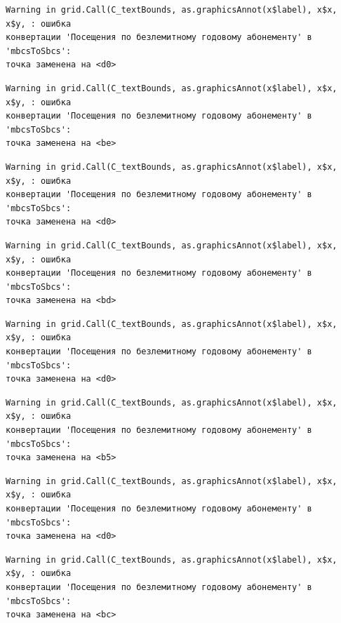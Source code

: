\documentclass[
  letterpaper,
  DIV=11,
  numbers=noendperiod]{scrreprt}
\begin{document}
\begin{verbatim}
Warning in grid.Call(C_textBounds, as.graphicsAnnot(x$label), x$x, x$y, : ошибка
конвертации 'Посещения по безлемитному годовому абонементу' в 'mbcsToSbcs':
точка заменена на <d0>
\end{verbatim}

\begin{verbatim}
Warning in grid.Call(C_textBounds, as.graphicsAnnot(x$label), x$x, x$y, : ошибка
конвертации 'Посещения по безлемитному годовому абонементу' в 'mbcsToSbcs':
точка заменена на <be>
\end{verbatim}

\begin{verbatim}
Warning in grid.Call(C_textBounds, as.graphicsAnnot(x$label), x$x, x$y, : ошибка
конвертации 'Посещения по безлемитному годовому абонементу' в 'mbcsToSbcs':
точка заменена на <d0>
\end{verbatim}

\begin{verbatim}
Warning in grid.Call(C_textBounds, as.graphicsAnnot(x$label), x$x, x$y, : ошибка
конвертации 'Посещения по безлемитному годовому абонементу' в 'mbcsToSbcs':
точка заменена на <bd>
\end{verbatim}

\begin{verbatim}
Warning in grid.Call(C_textBounds, as.graphicsAnnot(x$label), x$x, x$y, : ошибка
конвертации 'Посещения по безлемитному годовому абонементу' в 'mbcsToSbcs':
точка заменена на <d0>
\end{verbatim}

\begin{verbatim}
Warning in grid.Call(C_textBounds, as.graphicsAnnot(x$label), x$x, x$y, : ошибка
конвертации 'Посещения по безлемитному годовому абонементу' в 'mbcsToSbcs':
точка заменена на <b5>
\end{verbatim}

\begin{verbatim}
Warning in grid.Call(C_textBounds, as.graphicsAnnot(x$label), x$x, x$y, : ошибка
конвертации 'Посещения по безлемитному годовому абонементу' в 'mbcsToSbcs':
точка заменена на <d0>
\end{verbatim}

\begin{verbatim}
Warning in grid.Call(C_textBounds, as.graphicsAnnot(x$label), x$x, x$y, : ошибка
конвертации 'Посещения по безлемитному годовому абонементу' в 'mbcsToSbcs':
точка заменена на <bc>
\end{verbatim}
\end{document}
